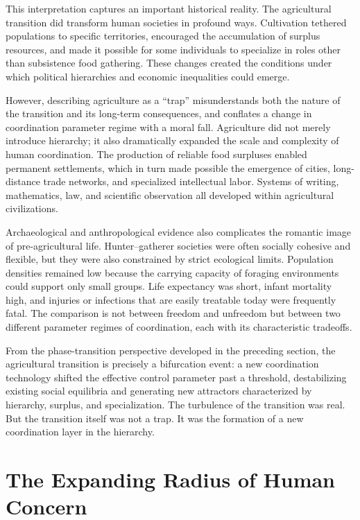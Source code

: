 \documentclass[12pt]{article}
\begin{document}
This interpretation captures an important historical reality. The agricultural transition did transform human societies in profound ways. Cultivation tethered populations to specific territories, encouraged the accumulation of surplus resources, and made it possible for some individuals to specialize in roles other than subsistence food gathering. These changes created the conditions under which political hierarchies and economic inequalities could emerge.

However, describing agriculture as a ``trap'' misunderstands both the nature of the transition and its long-term consequences, and conflates a change in coordination parameter regime with a moral fall. Agriculture did not merely introduce hierarchy; it also dramatically expanded the scale and complexity of human coordination. The production of reliable food surpluses enabled permanent settlements, which in turn made possible the emergence of cities, long-distance trade networks, and specialized intellectual labor. Systems of writing, mathematics, law, and scientific observation all developed within agricultural civilizations.

Archaeological and anthropological evidence also complicates the romantic image of pre-agricultural life. Hunter--gatherer societies were often socially cohesive and flexible, but they were also constrained by strict ecological limits. Population densities remained low because the carrying capacity of foraging environments could support only small groups. Life expectancy was short, infant mortality high, and injuries or infections that are easily treatable today were frequently fatal. The comparison is not between freedom and unfreedom but between two different parameter regimes of coordination, each with its characteristic tradeoffs.

From the phase-transition perspective developed in the preceding section, the agricultural transition is precisely a bifurcation event: a new coordination technology shifted the effective control parameter past a threshold, destabilizing existing social equilibria and generating new attractors characterized by hierarchy, surplus, and specialization. The turbulence of the transition was real. But the transition itself was not a trap. It was the formation of a new coordination layer in the hierarchy.

\section{The Expanding Radius of Human Concern}
\end{document}
